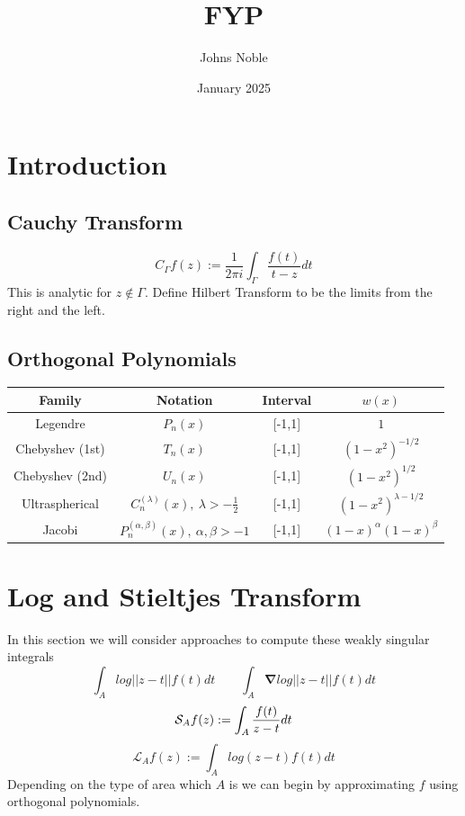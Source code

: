 \documentclass{article}
\title{FYP}
\author{Johns Noble}
\date{January 2025}
\begin{document}
\maketitle

\newpage
\tableofcontents
\newpage

\section{Introduction}
\subsection{Cauchy Transform}
\begin{equation} \label{cauchy transform}
C_\Gamma f(z):=\frac{1}{2\pi i}\int_\Gamma \frac{f(t)}{t-z}dt
\end{equation}
This is analytic for $z \not\in \Gamma$. Define Hilbert Transform to be the limits from the right and the left.
\subsection{Orthogonal Polynomials}
\begin{center}
\begin{tabular}{ |c|c|c|c| } 
 \hline
	Family & Notation & Interval & $w(x)$ \\ 
 \hline
	Legendre & $P_n(x)$ & [-1,1] & $1$ \\ 
	Chebyshev (1st) & $T_n(x)$ & [-1,1] & $(1-x^2)^{-1/2}$ \\ 
	Chebyshev (2nd) & $U_n(x)$ & [-1,1] & $(1-x^2)^{1/2}$ \\
	Ultraspherical & $C_n^{(\lambda)}(x),\:\lambda>-\frac{1}{2}$ & [-1,1] & $(1-x^2)^{\lambda-1/2}$ \\
	Jacobi & $P_n^{(\alpha,\beta)}(x),\:\alpha,\beta>-1$ & [-1,1] & $(1-x)^\alpha(1-x)^\beta$ \\
 \hline
\end{tabular}
\end{center}
\section{Log and Stieltjes Transform}
In this section we will consider approaches to compute these weakly singular integrals
$$ \int_Alog||z-t||f(t)dt \qquad \int_A\mathbf{\nabla}log||z-t||f(t)dt $$
\begin{equation}\label{stieltjes transform}
	\mathcal{S}_Af(z):= \int_A\frac{f(t)}{z-t}dt \\
\end{equation}
\begin{equation}\label{log transform}
	\mathcal{L}_Af(z):= \int_Alog(z-t)f(t)dt
\end{equation}
Depending on the type of area which $A$ is we can begin by approximating $f$ using orthogonal polynomials.
\end{document}
